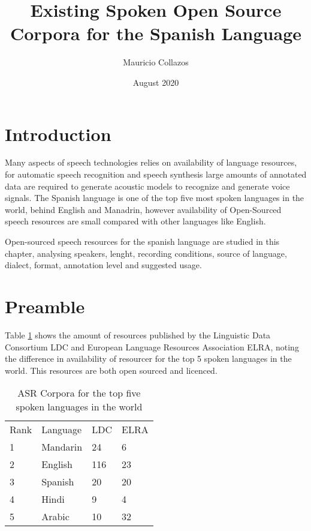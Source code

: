 \documentclass{article}
\title{Existing Spoken Open Source Corpora for the Spanish Language}
\author{Mauricio Collazos}
\date{August 2020}
\begin{document}
\maketitle

\section{Introduction}

Many aspects of speech technologies relies on availability of language resources, for automatic speech recognition and speech synthesis large amounts of annotated data are required to generate acoustic models to recognize and generate voice signals. The Spanish language is one of the top five most spoken languages in the world, behind English and Manadrin, however availability of Open-Sourced speech resources are small compared with other languages like English.

Open-sourced speech resources for the spanish language are studied in this chapter, analysing speakers, lenght, recording conditions, source of language, dialect, format, annotation level and suggested usage.


\section{Preamble}

Table \ref{tab:resources_by_langauge} shows the amount of resources published by the Linguistic Data Consortium LDC and European Language Resources Association ELRA, noting the difference in availability of resourcer for the top 5 spoken languages in the world. This resources are both open sourced and licenced.


\begin{table}[h]
\caption{ASR Corpora for the top five spoken languages in the world \cite{HernndezMena2017}}
\label{tab:resources_by_langauge}
\begin{tabular}{llll}
Rank & Language & LDC & ELRA \\
1    & Mandarin & 24  & 6    \\
2    & English  & 116 & 23   \\
3    & Spanish  & 20  & 20   \\
4    & Hindi    & 9   & 4    \\
5    & Arabic   & 10  & 32  
\end{tabular}
\end{table}
\end{document}
